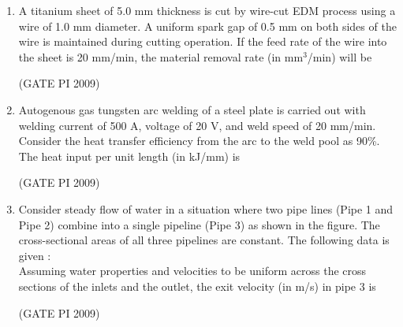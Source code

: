 \documentclass[journal,12pt,onecolumn]{IEEEtran}
\theoremstyle{remark}
\begin{document}
\begin{enumerate}
\begin{enumerate}
\begin{multicols}{2}
\end{multicols}
\end{enumerate}
\hfill (GATE PI 2009)
\item A titanium sheet of 5.0 mm thickness is cut by wire-cut EDM process using a wire of 1.0 mm diameter. A uniform spark gap of 0.5 mm on both sides of the wire is maintained during cutting operation. If the feed rate of the wire into the sheet is 20 mm/min, the material removal rate (in mm$^3$/min) will be
\begin{enumerate}
\end{enumerate}
\hfill (GATE PI 2009)
\item Autogenous gas tungsten arc welding of a steel plate is carried out with welding current of 500 A, voltage of 20 V, and weld speed of 20 mm/min. Consider the heat transfer efficiency from the arc to the weld pool as 90\%. The heat input per unit length (in kJ/mm) is
\begin{enumerate}
\end{enumerate}

\hfill (GATE PI 2009)
\item Consider steady flow of water in a situation where two pipe lines (Pipe 1 and Pipe 2) combine into a single pipeline (Pipe 3) as shown in the figure. The cross-sectional areas of all three pipelines are constant. The following data is given : \\
$$$$
Assuming water properties and velocities to be uniform across the cross sections of the inlets and the outlet, the exit velocity (in m/s) in pipe 3 is
\begin{enumerate}
\end{enumerate}
\hfill (GATE PI 2009)


\end{enumerate}
\end{document}
